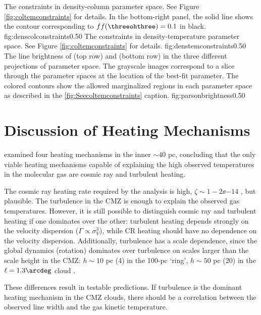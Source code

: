 {The constraints in density-column parameter space.
See Figure \ref{fig:coltemconstraints} for details.  In the bottom-right panel, the
solid line shows the contour corresponding to $ff(\threeohthree)=0.1$ in
black.}
{fig:denscolconstraints}{0.5}{0}
{The constraints in density-temperature parameter space.
See Figure \ref{fig:coltemconstraints} for details.}
{fig:denstemconstraints}{0.5}{0}
{The line brightness of \para \threeohthree (top row) and \para \threetwoone
(bottom row) in the three different projections of parameter space.  The
grayscale images correspond to a slice through the parameter spaces at the
location of the best-fit parameter.  The colored contours show the allowed
marginalized regions in each parameter space as described in the
\ref{fig:Seecoltemconstraints} caption.}
{fig:parsonbrightness}{0.5}{0}

\section{Discussion of Heating Mechanisms}
\citet{Ao2013a} examined four heating mechanisms in the inner $\sim 40$ pc,
concluding that the only viable heating mechanisms capable of explaining the
high observed temperatures in the molecular gas are cosmic ray and turbulent
heating.  

The cosmic ray heating rate required by the \citet{Ao2013a} analysis is high,
$\zeta\sim1-2\ee{-14}$ \pers, but plausible.  The turbulence in the CMZ is
enough to explain the observed gas temperatures.  However, it is still possible
to distinguish cosmic ray and turbulent heating if one dominates over the
other: turbulent heating depends strongly on the velocity dispersion ($\Gamma
\propto \sigma_V^3$), while CR heating should have no dependence on the
velocity dispersion.  Additionally, turbulence has a scale dependence, since
the global dynamics (rotation) dominates over turbulence on scales larger than
the scale height in the CMZ: $h\sim10$ pc (4\arcmin) in the 100-pc `ring',
$h\sim50$ pc (20\arcmin) in the $\ell=1.3\arcdeg$ cloud \citep{Kruijssen2013a}.

These differences result in testable predictions.  If turbulence is the
dominant heating mechanism in the CMZ clouds, there should be a correlation
between the observed line width and the gas kinetic temperature.

